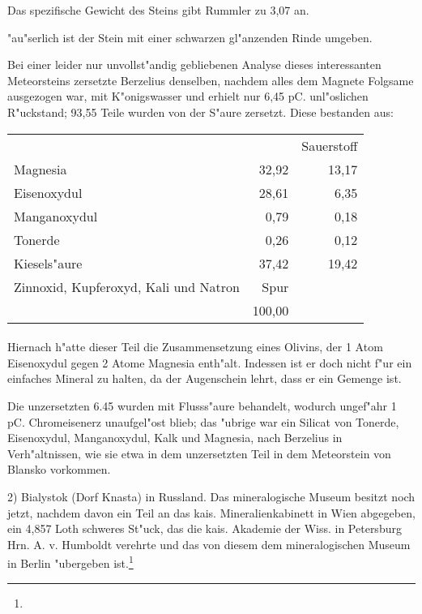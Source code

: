 \documentclass[a4paper, 11pt, oneside]{article}
\begin{document}
Das spezifische Gewicht des Steins gibt Rummler zu 3,07 an.

"au"serlich ist der Stein mit einer schwarzen gl"anzenden Rinde umgeben.

Bei einer leider nur unvollst"andig gebliebenen Analyse dieses interessanten Meteorsteins zersetzte Berzelius denselben, nachdem alles dem Magnete Folgsame ausgezogen war, mit K"onigswasser und erhielt nur 6,45 pC. unl"oslichen R"uckstand; 93,55 Teile wurden von der S"aure zersetzt. Diese bestanden aus:
\begin{center}
\begin{tabular}{ l r r }
     & & Sauerstoff\\
    Magnesia & 32,92 & 13,17\\
    Eisenoxydul & 28,61 & 6,35\\
    Manganoxydul & 0,79 & 0,18\\
    Tonerde & 0,26 & 0,12\\
    Kiesels"aure & 37,42 & 19,42\\  
    Zinnoxid, Kupferoxyd, Kali und Natron & Spur & \\  
     & 100,00 & \\
\end{tabular}
\end{center}
\paragraph{}
Hiernach h"atte dieser Teil die Zusammensetzung eines Olivins, der 1 Atom Eisenoxydul gegen 2 Atome Magnesia enth"alt. Indessen ist er doch nicht f"ur ein einfaches Mineral zu halten, da der Augenschein lehrt, dass er ein Gemenge ist.

Die unzersetzten 6.45 wurden mit Flusss"aure behandelt, wodurch ungef"ahr 1 pC. Chromeisenerz unaufgel"ost blieb; das "ubrige war ein Silicat von Tonerde, Eisenoxydul, Manganoxydul, Kalk und Magnesia, nach Berzelius in Verh"altnissen, wie sie etwa in dem unzersetzten Teil in dem Meteorstein von Blansko vorkommen.

2) Bialystok (Dorf Knasta) in Russland. Das mineralogische Museum besitzt noch jetzt, nachdem davon ein Teil an das kais. Mineralienkabinett in Wien abgegeben, ein 4,857 Loth schweres St"uck, das die kais. Akademie der Wiss. in Petersburg Hrn. A. v. Humboldt verehrte und das von diesem dem mineralogischen Museum in Berlin "ubergeben ist.\footnote{}
\end{document}
